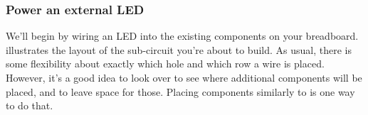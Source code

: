 \subsubsection{\howto Power an external LED}
We'll begin by wiring an LED into the existing components on your breadboard.
 illustrates the layout of the sub-circuit you're about to build.
As usual, there is some flexibility about exactly which hole and which row a wire is placed.
However, it's a good idea to look over  to see where additional components will be placed, and to leave space for those.
Placing components similarly to  is one way to do that.
\begin{marginfigure}[-8cm]
	\begin{center}

\end{center}
\end{marginfigure}
